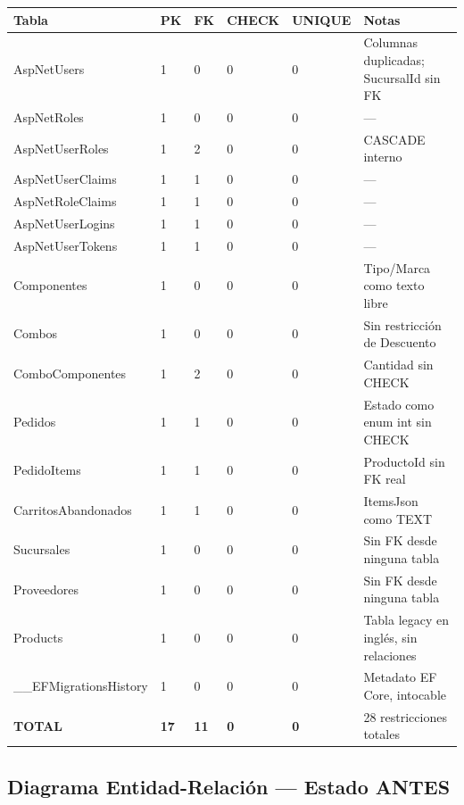 \begin{center}
\begin{tablaAPA}
\begin{tabular}{L{3.2cm} C{1.4cm} C{1.4cm} C{1.4cm} C{1.4cm} L{4.2cm}}
\toprule
\textbf{Tabla} & \textbf{PK} & \textbf{FK} & \textbf{CHECK} & \textbf{UNIQUE} & \textbf{Notas} \\
\midrule
AspNetUsers        & 1 & 0 & 0 & 0 & Columnas duplicadas; SucursalId sin FK \\
AspNetRoles        & 1 & 0 & 0 & 0 & --- \\
AspNetUserRoles    & 1 & 2 & 0 & 0 & CASCADE interno \\
AspNetUserClaims   & 1 & 1 & 0 & 0 & --- \\
AspNetRoleClaims   & 1 & 1 & 0 & 0 & --- \\
AspNetUserLogins   & 1 & 1 & 0 & 0 & --- \\
AspNetUserTokens   & 1 & 1 & 0 & 0 & --- \\
Componentes        & 1 & 0 & 0 & 0 & Tipo/Marca como texto libre \\
Combos             & 1 & 0 & 0 & 0 & Sin restricción de Descuento \\
ComboComponentes   & 1 & 2 & 0 & 0 & Cantidad sin CHECK \\
Pedidos            & 1 & 1 & 0 & 0 & Estado como enum int sin CHECK \\
PedidoItems        & 1 & 1 & 0 & 0 & ProductoId sin FK real \\
CarritosAbandonados& 1 & 1 & 0 & 0 & ItemsJson como TEXT \\
Sucursales         & 1 & 0 & 0 & 0 & Sin FK desde ninguna tabla \\
Proveedores        & 1 & 0 & 0 & 0 & Sin FK desde ninguna tabla \\
Products           & 1 & 0 & 0 & 0 & Tabla legacy en inglés, sin relaciones \\
\_\_EFMigrationsHistory & 1 & 0 & 0 & 0 & Metadato EF Core, intocable \\
\midrule
\textbf{TOTAL} & \textbf{17} & \textbf{11} & \textbf{0} & \textbf{0} & 28 restricciones totales \\
\bottomrule
\end{tabular}
\end{tablaAPA}
\label{tab:inventario-antes}
\end{center}

\subsection{Diagrama Entidad-Relación --- Estado ANTES}

